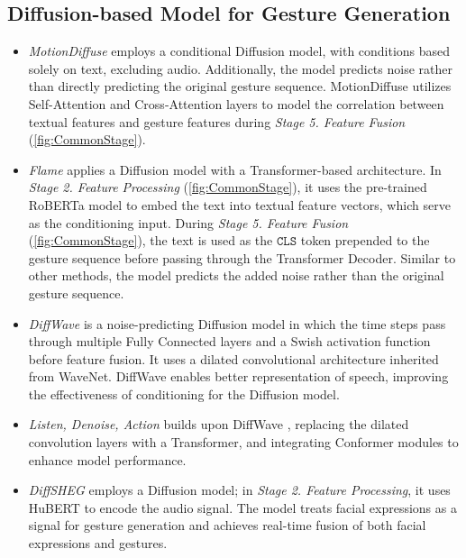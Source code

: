 \subsection{Diffusion-based Model for Gesture Generation}
\label{sec:diffusionbase}




\begin{itemize}
	\item \textit{MotionDiffuse} \citep{zhang2022motiondiffuse} employs a conditional Diffusion model, with conditions based solely on text, excluding audio. Additionally, the model predicts noise rather than directly predicting the original gesture sequence. MotionDiffuse utilizes Self-Attention and Cross-Attention layers to model the correlation between textual features and gesture features during \textit{Stage 5. Feature Fusion} (\autoref{fig:CommonStage}).
	
	\item \textit{Flame} \citep{kim2023flame} applies a Diffusion model with a Transformer-based architecture. In \textit{Stage 2. Feature Processing} (\autoref{fig:CommonStage}), it uses the pre-trained RoBERTa model to embed the text into textual feature vectors, which serve as the conditioning input. During \textit{Stage 5. Feature Fusion} (\autoref{fig:CommonStage}), the text is used as the $\texttt{CLS}$ token prepended to the gesture sequence before passing through the Transformer Decoder. Similar to other methods, the model predicts the added noise rather than the original gesture sequence.
	
	\item \textit{DiffWave} \citep{kong2020diffwave} is a noise-predicting Diffusion model in which the time steps pass through multiple Fully Connected layers and a Swish activation function before feature fusion. It uses a dilated convolutional architecture inherited from WaveNet. DiffWave enables better representation of speech, improving the effectiveness of conditioning for the Diffusion model.
	
	\item \textit{Listen, Denoise, Action} \citep{alexanderson2022listen} builds upon DiffWave \citep{kong2020diffwave}, replacing the dilated convolution layers with a Transformer, and integrating Conformer modules to enhance model performance.
	
	\item \textit{DiffSHEG} \citep{chen2024diffsheg} employs a Diffusion model; in \textit{Stage 2. Feature Processing}, it uses HuBERT to encode the audio signal. The model treats facial expressions as a signal for gesture generation and achieves real-time fusion of both facial expressions and gestures.
	

\end{itemize}
